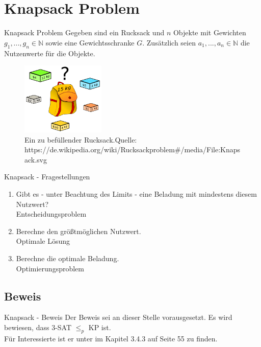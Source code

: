 \documentclass[12pt,donthandout,notes=dontshow,xcolor=table]{beamer}
\begin{document}
\section{Knapsack Problem}
\begin{frame}{Knapsack Problem}
Gegeben sind ein Rucksack und \(n\) Objekte mit Gewichten \(g_1,...,g_n \in \mathbb{N}\) sowie eine Gewichtsschranke \(G\).
Zusätzlich seien \(a_1,...,a_n \in \mathbb{N}\) die Nutzenwerte für die Objekte. \cite{wegener}
\pause
\begin{figure}
\includegraphics[width=4cm]{figures/knapsack.png}
\caption{Ein zu befüllender Rucksack.\newline \newline \tiny Quelle: https://de.wikipedia.org/wiki/Rucksackproblem\#/media/File:Knapsack.svg}
\end{figure}
\end{frame}

\begin{frame}{Knapsack - Fragestellungen}
\begin{enumerate}
\item Gibt es - unter Beachtung des Limits - eine Beladung mit mindestens diesem Nutzwert?\\
\textrightarrow Entscheidungsproblem
\newline \pause
\item Berechne den größtmöglichen Nutzwert.\\
\textrightarrow Optimale Lösung
\newline \pause
\item Berechne die optimale Beladung.\\
\textrightarrow Optimierungsproblem
\end{enumerate}
\end{frame}

\subsection{Beweis}
\begin{frame}{Knapsack - Beweis}
Der Beweis sei an dieser Stelle vorausgesetzt.
Es wird bewiesen, dass 3-SAT \(\le_p\) KP ist.\\
Für Interessierte ist er unter \cite{wegener} im Kapitel 3.4.3 auf Seite 55 zu finden.
\end{frame}
\end{document}
